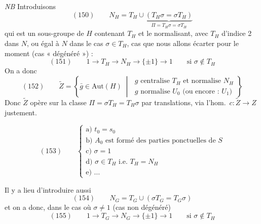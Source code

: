 \documentclass[11pt,a4paper]{article}
\begin{document}
\emph{NB} Introduisons
\[
(150)\qquad N_H=T_H\cup\underbrace{(T_H\sigma=\sigma T_H)}_{\Pi=T_H\sigma=\sigma T_H}
\]
qui est un sous-groupe de $H$  contenant $T_H$ et le normalisant, avec $T_H$
d'indice 2 dans $N$, ou égal à $N$ dans le cas $\sigma\in T_H$,  cas \ill{}
que nous allons écarter pour le moment (cas «  dégénéré ») :
\[
(151)\qquad 1\longrightarrow T_H\longrightarrow N_H\longrightarrow\{\pm1\}\longrightarrow 1
\qquad \text{si } \sigma\notin T_H
\]
On a donc
\[
(152)\qquad \widetilde{Z}=\left\{\bar g\in\mathrm{Aut}(H)\;\middle|\;
\begin{array}{l}
g \text{ centralise } T_H \text{ et normalise } N_H\\
g \text{ normalise } U_0 \text{ (ou encore : } U_1)
\end{array}\right\}
\]
Donc $\widetilde{Z}$ opère sur la classe $\Pi=\sigma T_H=T_H\sigma$ par translations, via
l'hom.\ $c\colon\widetilde{Z}\to Z$ justement.

\[
(153)\qquad
\begin{cases}
\text{a) } t_0=s_0\\
\text{b) } A_0 \text{ est formé des parties ponctuelles de } S\\
\text{c) } \sigma=1\\
\text{d) } \sigma\in T_H \text{ i.e. } T_H=N_H\\
\text{e) } \ldots
\end{cases}
\]

Il y a lieu d'introduire aussi
\[
(154)\qquad N_G=T_G\cup(\sigma T_G=T_G\sigma)
\]
et on a donc, dans le cas où $\sigma\neq1$ (cas non dégénéré)
\[
(155)\qquad 1\longrightarrow T_G\longrightarrow N_G\longrightarrow\{\pm1\}\longrightarrow 1
\qquad \text{si } \sigma\notin T_H
\]
\end{document}
